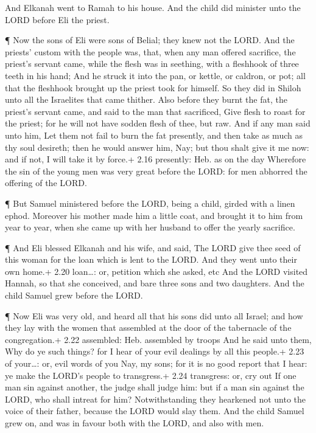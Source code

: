  And Elkanah went to Ramah to his house. And the child did
minister unto the LORD before Eli the priest.

 ¶ Now the sons of Eli were sons of Belial; they knew not
the LORD.  And the priests' custom with the people was,
that, when any man offered sacrifice, the priest's servant came, while
the flesh was in seething, with a fleshhook of three teeth in his hand;
 And he struck it into the pan, or kettle, or caldron, or
pot; all that the fleshhook brought up the priest took for himself. So
they did in Shiloh unto all the Israelites that came thither.
 Also before they burnt the fat, the priest's servant came,
and said to the man that sacrificed, Give flesh to roast for the priest;
for he will not have sodden flesh of thee, but raw.  And if
any man said unto him, Let them not fail to burn the fat presently, and
then take as much as thy soul desireth; then he would answer him, Nay;
but thou shalt give it me now: and if not, I will take it by force.+
2.16 presently: Heb. as on the day  Wherefore the sin of
the young men was very great before the LORD: for men abhorred the
offering of the LORD.

 ¶ But Samuel ministered before the LORD, being a child,
girded with a linen ephod.  Moreover his mother made him a
little coat, and brought it to him from year to year, when she came up
with her husband to offer the yearly sacrifice.

 ¶ And Eli blessed Elkanah and his wife, and said, The LORD
give thee seed of this woman for the loan which is lent to the LORD. And
they went unto their own home.+ 2.20 loan\ldots: or, petition which she
asked, etc  And the LORD visited Hannah, so that she
conceived, and bare three sons and two daughters. And the child Samuel
grew before the LORD.

 ¶ Now Eli was very old, and heard all that his sons did
unto all Israel; and how they lay with the women that assembled at the
door of the tabernacle of the congregation.+ 2.22 assembled: Heb.
assembled by troops  And he said unto them, Why do ye such
things? for I hear of your evil dealings by all this people.+ 2.23 of
your\ldots: or, evil words of you  Nay, my sons; for it is
no good report that I hear: ye make the LORD's people to transgress.+
2.24 transgress: or, cry out  If one man sin against
another, the judge shall judge him: but if a man sin against the LORD,
who shall intreat for him? Notwithstanding they hearkened not unto the
voice of their father, because the LORD would slay them. 
And the child Samuel grew on, and was in favour both with the LORD, and
also with men.

